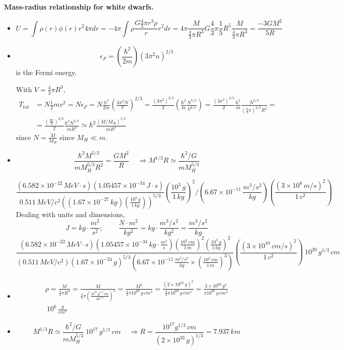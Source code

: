  \textbf{Mass-radius relationship for white dwarfs.}  
\begin{itemize}
\item[(a)] 
\[
U  = \int \rho(r) \phi(r) r^2 4\pi dr = -4\pi \int \rho \frac{ G \frac{4}{3} \pi r^3 \rho }{r} r^2 dr = 4\pi \frac{M }{ \frac{4}{3} \pi R^3 } G \frac{4}{3} \pi  \frac{1}{5} R^5 \frac{M}{ \frac{4}{3} \pi R^3} = \boxed{ \frac{-3 GM^2}{5R} }
\]
\item[(b)] \[
\epsilon_F = \left( \frac{\hbar^2}{2m} \right) (3\pi^2 n )^{2/3}
\]
is the Fermi energy.  

With $V = \frac{4}{3} \pi R^3$, 
\[
\begin{aligned}
T_{tot} & = N \frac{1}{2} m v^2 = N \epsilon_F = N \frac{h^2}{2m} \left( \frac{3\pi^2 N }{V} \right)^{2/3} = \frac{ (3\pi^2)^{2/3} }{ 2} \left( \frac{\hbar^2}{m} \frac{ N^{5/3} }{ V^{2/3}} \right) = \frac{(3\pi^2 )^{2/3} }{2} \frac{\hbar^2}{m} \frac{N^{5/3}}{ \left( \frac{4}{3} \pi \right)^{2/3} R^2}  = \\
 & = \frac{ \left( \frac{ 9 \pi }{4} \right)^{2/3} }{ 2} \frac{ \hbar^2 N^{5/3}}{ mR^2 } \simeq \hbar^2 \frac{ ( M/M_H)^{5/3} }{ mR^2}
\end{aligned}
\]
since $N = \frac{M}{M_H}$ since $M_H \ll m$.  
\item[(c)] 
\[
\frac{\hbar^2  M^{5/3} }{ m M_H^{5/3} R^2} = \frac{GM^2}{R} \quad \, \Longrightarrow M^{1/3} R \simeq \frac{ \hbar^2 /G }{ m M_H^{5/3} }
\] 

\[
\frac{ ( 6.582 \times 10^{-22} \, MeV\cdot s)( 1.05457 \times 10^{-34} \, J \cdot s ) }{ 0.511 \, MeV/c^2 ( ( 1.67 \times 10^{-27} \, kg  ) \left( \frac{  10^3 \, g }{ 1 \, kg} \right) )^{5/3} } \left( \frac{ 10^3 \, g}{ 1 \, kg } \right)^2 / (6.67 \times 10^{-11} \, \frac{ m^3/s^2}{ kg } ) \left( \frac{ (3\times 10^8 \, m/s )^2}{ 1\, c^2} \right) 
\]
Dealing with units and dimensions,
\[
J = kg \cdot \frac{m^2}{s^2}; \quad \quad \, \frac{N \cdot m^2}{kg^2} = kg \cdot \frac{m^3/s^2}{kg^2} = \frac{ m^3/s^2}{ kg }
\]
\[
\frac{ (6.582 \times 10^{-22} \, MeV \cdot s )( 1.05457 \times 10^{-34} \, kg \cdot \frac{m^2}{s} ) \left( \frac{10^2 \, cm}{ 1 \, m } \right)^2 \left( \frac{ 10^3 \, g }{ 1 \, kg } \right)^2 }{ (0.511 \, MeV/c^2 )( 1.67 \times 10^{-24} \, g )^{5/3} (6.67 \times 10^{-11} \, \frac{m^3/s^2}{ kg} \times \left( \frac{10^2 \, cm}{ 1 \, m } \right)^3 ) } \left( \frac{ (3\times 10^{10} \, cm/s )^2}{ 1 \, c^2} \right) ~ 10^{20} \, g^{1/3} \, cm
\]
\item[(d)] \[
\begin{gathered}
  \rho = \frac{M}{ \frac{4}{3} \pi R^3} = \frac{ M }{ \frac{4}{3} \pi \left( \frac{ 10^{20} \, g^{1/3} \, cm }{ M^{1/3} } \right)^3 } = \frac{M^2}{ \frac{4}{3} \pi 10^{60} \, g \, cm^3 } = \frac{ ( 2 \times 10^{33} \, g)^2}{ \frac{4}{3} \pi 10^{60} \, g \, cm^3 } = \frac{ 3 \times 10^{66} \, g^2 }{ \pi 10^{60} \, g \, cm^3} \\
  ~ 10^6 \, \frac{g}{cm^3}
\end{gathered}
\] 
\item[(e)] \[
M^{1/3} R \simeq \frac{ \hbar^2/G }{ m M_H^{5/3}} ~ 10^{17} \, g^{1/3} \, cm \quad \, \Longrightarrow R = \frac{ 10^{17} g^{1/3} \, cm }{ (2\times 10^{33} \, g)^{1/3} } = 7.937 \, km
\]
\end{itemize}

